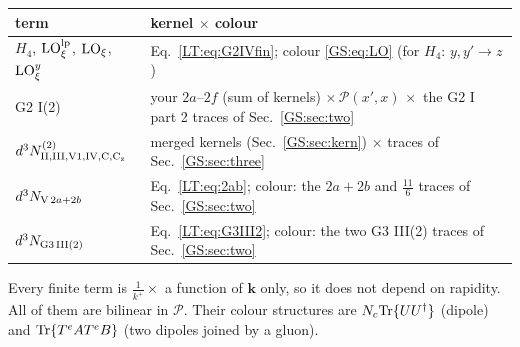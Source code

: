 \documentclass[10pt]{article}
\numberwithin{equation}{section}
\newcommand{\LO}{{\rm LO}}
\newcommand{\PP}{\mathcal P}
\newcommand{\Tr}{{\rm Tr}}
\newcommand{\Ud}{U^\dagger}
\begin{document}
\begin{center}\small
\begin{tabular}{@{}p{}p{}@{}}\toprule
term & kernel $\times$ colour\\\midrule
$H_4$, $\LO^{\rm lp}_\xi$, $\LO_\xi$, $\LO^y_\xi$ & Eq.~\eqref{LT:eq:G2IVfin}; colour \eqref{GS:eq:LO} (for $H_4$: $y,y'\to z$)\\
G2 I(2) & your $2a$--$2f$ (sum of kernels) $\times\,\PP(x',x)\,\times$ the G2 I part 2 traces of Sec.~\ref{GS:sec:two}\\
$d^3N^{(2)}_{\rm II,III,V1,IV,C,C_z}$ & merged kernels (Sec.~\ref{GS:sec:kern}) $\times$ traces of Sec.~\ref{GS:sec:three}\\
$d^3N_{{\rm V}\,2a+2b}$ & Eq.~\eqref{LT:eq:2ab}; colour: the $2a+2b$ and $\frac{11}{6}$ traces of Sec.~\ref{GS:sec:two}\\
$d^3N_{\rm G3\,III(2)}$ & Eq.~\eqref{LT:eq:G3III2}; colour: the two G3 III(2) traces of Sec.~\ref{GS:sec:two}\\\bottomrule
\end{tabular}
\end{center}
Every finite term is $\frac{1}{k^+}\times$ a function of $\mathbf k$ only, so it does not depend on rapidity. All of them are bilinear in $\PP$. Their colour structures are $N_c\Tr\{U\Ud\}$ (dipole) and $\Tr\{T^eAT^eB\}$ (two dipoles joined by a gluon).
\end{document}
